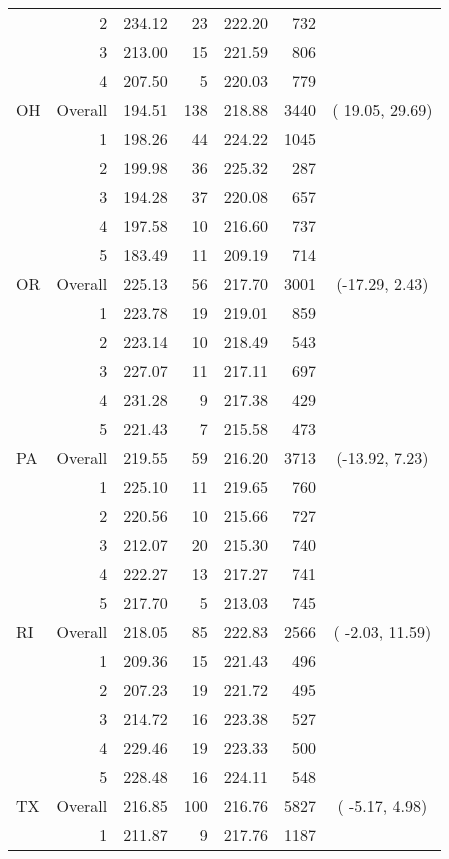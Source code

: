 \begin{longtable}{lrrr@{\extracolsep{.25cm}}rrc}
   & 2 & 234.12 &  23 & 222.20 & 732 &  \\ 
   & 3 & 213.00 &  15 & 221.59 & 806 &  \\ 
   & 4 & 207.50 &   5 & 220.03 & 779 &  \\ 
   \hline
OH & Overall & 194.51 & 138 & 218.88 & 3440 & ( 19.05,  29.69) \\ 
   & 1 & 198.26 &  44 & 224.22 & 1045 &  \\ 
   & 2 & 199.98 &  36 & 225.32 & 287 &  \\ 
   & 3 & 194.28 &  37 & 220.08 & 657 &  \\ 
   & 4 & 197.58 &  10 & 216.60 & 737 &  \\ 
   & 5 & 183.49 &  11 & 209.19 & 714 &  \\ 
   \hline
OR & Overall & 225.13 &  56 & 217.70 & 3001 & (-17.29,   2.43) \\ 
   & 1 & 223.78 &  19 & 219.01 & 859 &  \\ 
   & 2 & 223.14 &  10 & 218.49 & 543 &  \\ 
   & 3 & 227.07 &  11 & 217.11 & 697 &  \\ 
   & 4 & 231.28 &   9 & 217.38 & 429 &  \\ 
   & 5 & 221.43 &   7 & 215.58 & 473 &  \\ 
   \hline
PA & Overall & 219.55 &  59 & 216.20 & 3713 & (-13.92,   7.23) \\ 
   & 1 & 225.10 &  11 & 219.65 & 760 &  \\ 
   & 2 & 220.56 &  10 & 215.66 & 727 &  \\ 
   & 3 & 212.07 &  20 & 215.30 & 740 &  \\ 
   & 4 & 222.27 &  13 & 217.27 & 741 &  \\ 
   & 5 & 217.70 &   5 & 213.03 & 745 &  \\ 
   \hline
RI & Overall & 218.05 &  85 & 222.83 & 2566 & ( -2.03,  11.59) \\ 
   & 1 & 209.36 &  15 & 221.43 & 496 &  \\ 
   & 2 & 207.23 &  19 & 221.72 & 495 &  \\ 
   & 3 & 214.72 &  16 & 223.38 & 527 &  \\ 
   & 4 & 229.46 &  19 & 223.33 & 500 &  \\ 
   & 5 & 228.48 &  16 & 224.11 & 548 &  \\ 
   \hline
TX & Overall & 216.85 & 100 & 216.76 & 5827 & ( -5.17,   4.98) \\ 
   & 1 & 211.87 &   9 & 217.76 & 1187 &  \\ 

\end{longtable}
